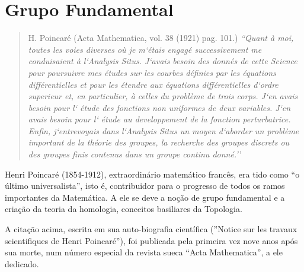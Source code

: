 \part{Grupo Fundamental}

\begin{quote}{H. Poincaré (Acta Mathematica, vol. 38 (1921) pag. 101.)}
\textit{``Quant à moi, toutes les voies diverses où je m`étais engagé
successivement me conduisaient à l`Analysis Situs. J`avais besoin
des donnés de cette Science pour poursuivre mes études sur les
courbes définies par les équations différentielles et pour les étendre
aux équations différentielles d`ordre superieur et, en particulier,
à celles du problème de trois corps. J`en avais besoin pour l` étude
des fonctions non uniformes de deux variables. J`en avais besoin
pour l` étude au developpement de la fonction perturbatrice. Enfin,
j`entrevoyais dans l`Analysis Situs un moyen d`aborder un problème
important de la théorie des groupes, la recherche des groupes 
discrets ou des groupes finis contenus dans un groupe continu donné.''}
\end{quote}

Henri Poincaré (1854-1912), extraordinário matemático francês, era
tido como ``o último universalista'', isto é, contribuidor para o
progresso de todos os ramos importantes da Matemática. A ele se deve a
noção de grupo fundamental e a criação da teoria da homologia,
conceitos basiliares da Topologia.

A citação acima, escrita em sua auto-biografia científica (''Notice
sur les travaux scientifiques de Henri Poincaré''), foi publicada pela
primeira vez nove anos após sua morte, num número especial da revista
sueca ``Acta Mathematica'', a ele dedicado.
